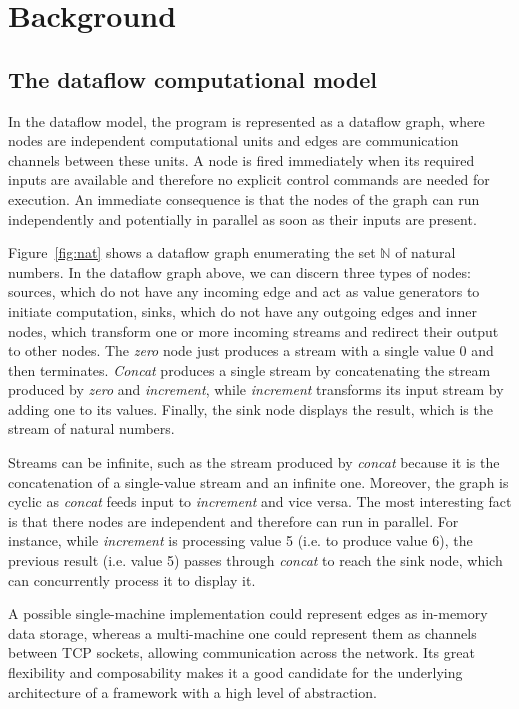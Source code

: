 \documentclass[sigplan,review,anonymous,screen]{acmart}
\begin{document}
\section{Background} \label{sec:background}

\subsection{The dataflow computational model}
In the dataflow model, the program is represented as a dataflow graph, where
nodes are independent computational units and edges are communication channels
between these units. A node is fired immediately when its required inputs are
available and therefore no explicit control commands are needed for execution.
An immediate consequence is that the nodes of the graph can run independently
and potentially in parallel as soon as their inputs are present.

Figure~\ref{fig:nat} shows a dataflow graph enumerating the set $\mathbb{N}$ of
natural numbers.
%
%
In the dataflow graph above, we can discern three types of nodes: sources, which
do not have any incoming edge and act as value generators to initiate
computation, sinks, which do not have any outgoing edges and inner nodes, which
transform one or more incoming streams and redirect their output to other nodes.
The \textit{zero} node just produces a stream with a single value 0 and then
terminates. \textit{Concat} produces a single stream by concatenating the stream
produced by \textit{zero} and \textit{increment}, while \textit{increment}
transforms its input stream by adding one to its values. Finally, the sink node
displays the result, which is the stream of natural numbers.

Streams can be infinite, such as the stream produced by \textit{concat} because
it is the concatenation of a single-value stream and an infinite one. Moreover,
the graph is cyclic as \textit{concat} feeds input to \textit{increment} and
vice versa. The most interesting fact is that there nodes are independent and
therefore can run in parallel. For instance, while \textit{increment} is
processing value 5 (i.e. to produce value 6), the previous result (i.e. value 5)
passes through \textit{concat} to reach the sink node, which can concurrently
process it to display it.

A possible single-machine implementation could represent edges as in-memory
data storage, whereas a multi-machine one could represent them as channels
between TCP sockets, allowing communication across the network. Its great
flexibility and composability makes it a good candidate for the underlying
architecture of a framework with a high level of abstraction.
\end{document}
